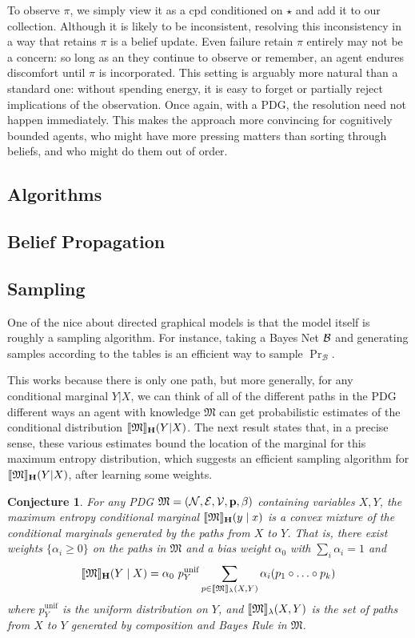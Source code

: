 \documentclass{article}
\theoremstyle{plain}
\newtheorem{conj}[theorem]{Conjecture}
\theoremstyle{definition}
\theoremstyle{remark}
\DeclarePairedDelimiter{\bbr}{\llbracket}{\rrbracket}
\newcommand\MaxEnt{_{\mathbf H}}
\newcommand{\dg}[1]{\mathfrak{#1}}
\newcommand{\MN}{PDG}
\numberwithin{equation}{section}
\begin{document}
	
	To observe $\pi$, we simply view it as a cpd conditioned on $\star$ and add it to our collection. 
	Although it is likely to be inconsistent, resolving this inconsistency in a way that retains $\pi$ is a belief update. 
	Even failure retain $\pi$ entirely may not be a concern: so long as an they continue to observe or remember, an agent endures discomfort until $\pi$ is incorporated. This setting is arguably more natural than a standard one: without spending energy, it is easy to forget or partially reject implications of the observation.	
	Once again, with a \MN, the resolution need not happen immediately. This makes the approach more convincing for cognitively bounded agents, who might have more pressing matters than sorting through beliefs, and who might do them out of order.

	\begin{vfull}
	\section{Algorithms} 
		\label{sec:algorithms}
	\subsection{Belief Propagation}
	
	
	\subsection{Sampling}
	
	One of the nice about directed graphical models is that the model itself is roughly a sampling algorithm. For instance, taking a Bayes Net $\cal B$ and generating samples according to the tables is an efficient way to sample $\Pr_{\mathcal B}$.

	This works because there is only one path, but more generally, for any conditional marginal $Y|X$, we can think of all of the different paths in the PDG different ways an agent with knowledge $\dg M$ can get probabilistic estimates of the conditional distribution $\bbr{\dg M}\MaxEnt(Y | X)$. The next result states that, in a precise sense, these various estimates bound the location of the marginal for this maximum entropy distribution, which suggests an efficient sampling algorithm for $\bbr{\dg M}\MaxEnt(Y | X)$, after learning some weights.
	
	\begin{conj}\label{thm:maxent-hull}
		For any PDG $\dg M = \mnvars[]$ containing variables $X, Y$, the maximum entropy conditional marginal $\bbr{\dg M}\MaxEnt(y \mid x)$ is a convex mixture of the conditional marginals generated by the paths from $X$ to $Y$.  That is, there exist weights $\{\alpha_i \geq 0\}$ on the paths in $\dg M$ and a bias weight $\alpha_0$ with $\sum_i {\alpha_i} = 1$ and
		\[ \bbr{\dg M}\MaxEnt(Y \mid X) = \alpha_0 \  p^{\text{unif}}_Y \sum_{p \in \bbr{\dg M}_\lambda(X, Y)} \alpha_i (p_1 \circ \ldots \circ p_k) \]
		where $p^{\text{unif}}_Y$ is the uniform distribution on $Y$, and $\bbr{\dg M}_\lambda(X,Y)$ is the set of paths from $X$ to $Y$ generated by composition and Bayes Rule in $\dg M$. 
	\end{conj}


\end{vfull}
\end{document}

